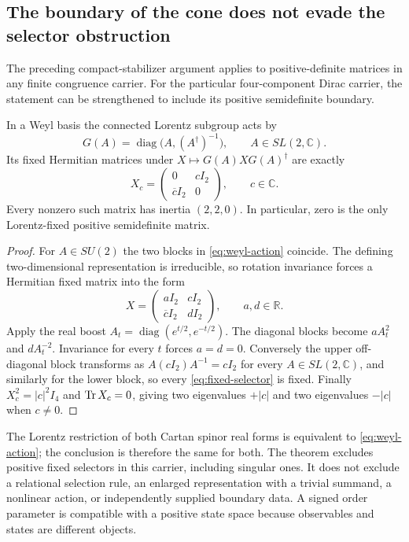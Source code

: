 \subsection{The boundary of the cone does not evade the selector obstruction}

The preceding compact-stabilizer argument applies to positive-definite
matrices in any finite congruence carrier.
For the particular four-component Dirac carrier, the statement can be
strengthened to include its positive semidefinite boundary.

\begin{theorem}
\label{thm:boundary-selector}
In a Weyl basis the connected Lorentz subgroup acts by
\begin{equation}
 G(A)=\operatorname{diag}\bigl(A,(A^\dagger)^{-1}\bigr),
 \qquad A\in SL(2,\mathbb C).
 \label{eq:weyl-action}
\end{equation}
Its fixed Hermitian matrices under $X\mapsto G(A)XG(A)^\dagger$ are exactly
\begin{equation}
 X_c=\begin{pmatrix}0&cI_2\\\overline cI_2&0\end{pmatrix},
 \qquad c\in\mathbb C.
 \label{eq:fixed-selector}
\end{equation}
Every nonzero such matrix has inertia $(2,2,0)$.
In particular, zero is the only Lorentz-fixed positive semidefinite matrix.
\end{theorem}
\begin{proof}
For $A\in SU(2)$ the two blocks in \eqref{eq:weyl-action} coincide.
The defining two-dimensional representation is irreducible, so rotation
invariance forces a Hermitian fixed matrix into the form
\[
 X=\begin{pmatrix}aI_2&cI_2\\\overline cI_2&dI_2\end{pmatrix},
 \qquad a,d\in\mathbb R.
\]
Apply the real boost $A_t=\operatorname{diag}(e^{t/2},e^{-t/2})$.
The diagonal blocks become $aA_t^2$ and $dA_t^{-2}$.
Invariance for every $t$ forces $a=d=0$.
Conversely the upper off-diagonal block transforms as
$A(cI_2)A^{-1}=cI_2$ for every $A\in SL(2,\mathbb C)$, and similarly for
the lower block, so every \eqref{eq:fixed-selector} is fixed.
Finally $X_c^2=|c|^2I_4$ and $\operatorname{Tr} X_c=0$, giving two eigenvalues
$+|c|$ and two eigenvalues $-|c|$ when $c\ne0$.
\end{proof}

The Lorentz restriction of both Cartan spinor real forms is equivalent to
\eqref{eq:weyl-action}; the conclusion is therefore the same for both.
The theorem excludes positive fixed selectors in this carrier, including
singular ones.
It does not exclude a relational selection rule, an enlarged representation
with a trivial summand, a nonlinear action, or independently supplied
boundary data.
A signed order parameter is compatible with a positive state space because
observables and states are different objects.
